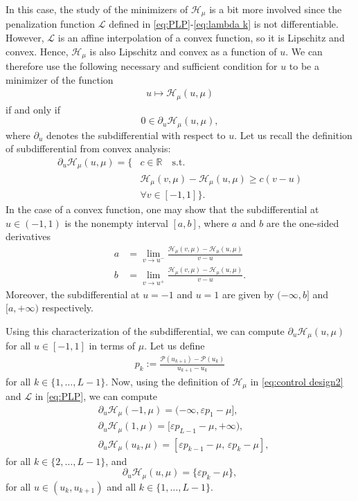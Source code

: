 \documentclass[twocolumn]{autart}    %
\begin{document}
In this case, the study of the minimizers of $\mathcal{H}_\mu$ is a bit more involved since the penalization function $\mathcal{L}$ defined in \eqref{eq:PLP}-\eqref{eq:lambda k} is not differentiable. However, $\mathcal{L}$ is an affine interpolation of a convex function, so it is Lipschitz and convex.  Hence, $\mathcal{H}_\mu$ is also Lipschitz and convex as a function of $u$. We can therefore use the following necessary and sufficient condition for $u$ to be a minimizer of  the function 
\begin{align*}
	u\mapsto \mathcal{H}_\mu (u,\mu)
\end{align*}
if and only if
\begin{equation}\label{opti cond subdiff}
	0\in \partial_u \mathcal{H}_\mu (u,\mu),
\end{equation}
where $\partial_u$ denotes the subdifferential with respect to $u$. Let us recall the definition of subdifferential from convex analysis:
\begin{align*}
	\partial_u \mathcal{H}_\mu (u,\mu) = \{  & c\in \mathbb{R} \quad \text{s.t.} 
	\\
	&\mathcal{H}_\mu (v,\mu) - \mathcal{H}_\mu (u,\mu) \geq c(v-u) 
	\\
	& \forall v\in [-1,1] \}. 
\end{align*}
In the case of a convex function, one may show that the subdifferential at $u\in (-1,1)$ is the nonempty interval $[a,b]$, where $a$ and $b$ are the one-sided derivatives
\begin{align*}
	a &= \lim_{v\to u^-} \frac{\mathcal{H}_\mu (v,\mu) - \mathcal{H}_\mu(u,\mu)}{v-u} 
	\\[5pt]
	b &= \lim_{v\to u^+} \frac{\mathcal{H}_\mu (v,\mu) - \mathcal{H}_\mu(u,\mu)}{v-u}. 
\end{align*}
Moreover, the subdifferential at $u=-1$ and $u=1$ are given by $(-\infty, b]$ and $[a,+\infty)$ respectively.

Using this characterization of the subdifferential, we can compute $\partial_u\mathcal{H}_\mu(u,\mu)$ for all $u\in [-1,1]$ in terms of $\mu$.
Let us define
\begin{align*} 
	p_k := \frac{\mathcal{P}(u_{k+1}) - \mathcal{P} (u_k) }{u_{k+1} - u_k} 
\end{align*} 
for all $k\in \{1, \ldots, L-1\}$. Now, using the definition of $\mathcal{H}_\mu$ in \eqref{eq:control design2} and $\mathcal{L}$ in \eqref{eq:PLP}, we can compute
\begin{align*}
	&\partial_u \mathcal{H}_\mu (-1,\mu) = (-\infty, \varepsilon p_1 -\mu], 
	\\[5pt]
	&\partial_u \mathcal{H}_\mu (1,\mu) = [\varepsilon p_{L-1} -\mu, +\infty), 
	\\[5pt]
	&\partial_u \mathcal{H}_\mu (u_k,\mu) = [\varepsilon p_{k-1} -\mu,  \, \varepsilon p_k -\mu],
\end{align*}
for all $k\in \{ 2, \ldots, L-1\}$, and
\begin{equation*}
	\partial_u \mathcal{H}_\mu(u,\mu) = \{\varepsilon p_k -\mu\},
\end{equation*}
for all $u\in (u_k, u_{k+1})$ and all $k\in \{ 1, \ldots, L-1 \}$.
\end{document}
